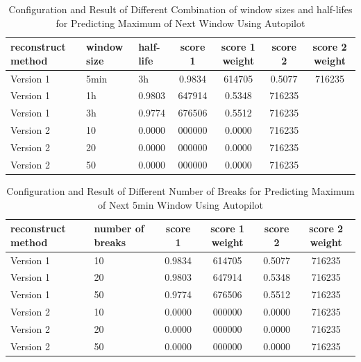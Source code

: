 \documentclass{article}
\begin{document}
\begin{table}[htbp]
  \begin{center}
    \caption{Configuration and Result of Different Combination of window sizes and half-lifes for Predicting Maximum of Next Window Using Autopilot}
    \label{tab:tab1.11.4}
    \begin{tabular}{l|l|l|*{4}{c}}
      \textbf{reconstruct method} & \textbf{window size} & \textbf{half-life} & \textbf{score 1} & \textbf{score 1 weight} & \textbf{score 2} & \textbf{score 2 weight} \\
      \hline
      Version 1 & 5min & 3h & 0.9834 & 614705 & 0.5077 & 716235\\
      Version 1 & 1h & 0.9803 & 647914 & 0.5348 & 716235\\
      Version 1 & 3h & 0.9774 & 676506 & 0.5512 & 716235\\
      Version 2 & 10 & 0.0000 & 000000 & 0.0000 & 716235\\
      Version 2 & 20 & 0.0000 & 000000 & 0.0000 & 716235\\
      Version 2 & 50 & 0.0000 & 000000 & 0.0000 & 716235\\
    \end{tabular}
  \end{center}
\end{table}

\begin{table}[htbp]
  \begin{center}
    \caption{Configuration and Result of Different Number of Breaks for Predicting Maximum of Next 5min Window Using Autopilot}
    \label{tab:tab1.11.3}
    \begin{tabular}{l|l|*{4}{c}}
      \textbf{reconstruct method} & \textbf{number of breaks} & \textbf{score 1} & \textbf{score 1 weight} & \textbf{score 2} & \textbf{score 2 weight} \\
      \hline
      Version 1 & 10 & 0.9834 & 614705 & 0.5077 & 716235\\
      Version 1 & 20 & 0.9803 & 647914 & 0.5348 & 716235\\
      Version 1 & 50 & 0.9774 & 676506 & 0.5512 & 716235\\
      Version 2 & 10 & 0.0000 & 000000 & 0.0000 & 716235\\
      Version 2 & 20 & 0.0000 & 000000 & 0.0000 & 716235\\
      Version 2 & 50 & 0.0000 & 000000 & 0.0000 & 716235\\
    \end{tabular}
  \end{center}
\end{table}
\end{document}
